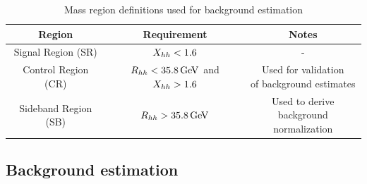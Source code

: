 \begin{table}[h!]
\centering
\captionsetup{justification=centering}

\hspace{-10pt}
\begin{tabular}{|c|c|c|}
\hline
Region & Requirement & Notes \\
\hline
Signal Region (SR) & $X_{hh} < 1.6$ & - \\ \hline
Control Region (CR) & $\Rhh < 35.8\GeV$ and $X_{hh} > 1.6$ & \specialcell{Used for validation\\of background estimates} \\ \hline
Sideband Region (SB) & $\Rhh > 35.8 \GeV$ & \specialcell{Used to derive\\background normalization} \\
\hline
\end{tabular}
\caption{
Mass region definitions used for background estimation
}
\label{tab:MassRegions}
\end{table}

\subsection{Background estimation}

